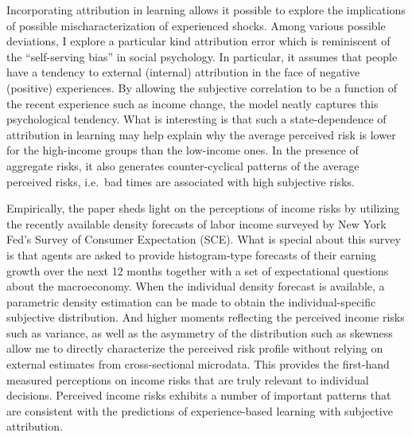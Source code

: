 \documentclass[12pt,notitlepage,onecolumn,aps,pra]{article}
\begin{document}
Incorporating attribution in learning allows it possible to explore the
implications of possible mischaracterization of experienced shocks.
Among various possible deviations, I explore a particular kind
attribution error which is reminiscent of the ``self-serving bias'' in
social psychology. In particular, it assumes that people have a tendency
to external (internal) attribution in the face of negative (positive)
experiences. By allowing the subjective correlation to be a function of
the recent experience such as income change, the model neatly captures
this psychological tendency. What is interesting is that such a
state-dependence of attribution in learning may help explain why the
average perceived risk is lower for the high-income groups than the
low-income ones. In the presence of aggregate risks, it also generates
counter-cyclical patterns of the average perceived risks, i.e.~bad times
are associated with high subjective risks.

Empirically, the paper sheds light on the perceptions of income risks by
utilizing the recently available density forecasts of labor income
surveyed by New York Fed's Survey of Consumer Expectation (SCE). What is
special about this survey is that agents are asked to provide
histogram-type forecasts of their earning growth over the next 12 months
together with a set of expectational questions about the macroeconomy.
When the individual density forecast is available, a parametric density
estimation can be made to obtain the individual-specific subjective
distribution. And higher moments reflecting the perceived income risks
such as variance, as well as the asymmetry of the distribution such as
skewness allow me to directly characterize the perceived risk profile
without relying on external estimates from cross-sectional microdata.
This provides the first-hand measured perceptions on income risks that
are truly relevant to individual decisions. Perceived income risks
exhibits a number of important patterns that are consistent with the
predictions of experience-based learning with subjective attribution.
\end{document}
